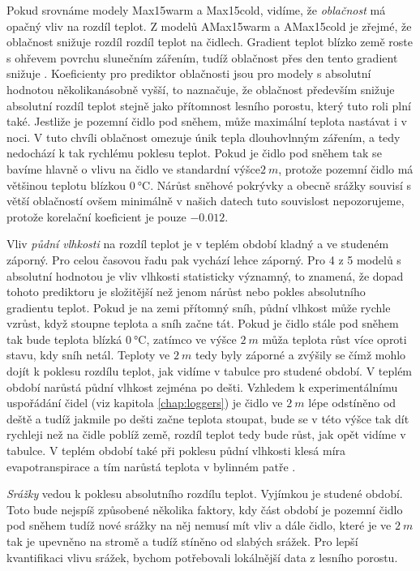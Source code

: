 Pokud srovnáme modely Max15warm a Max15cold, vidíme, že \textit{oblačnost} má opačný vliv na rozdíl teplot. Z modelů AMax15warm a AMax15cold je zřejmé, že oblačnost snižuje rozdíl rozdíl teplot na čidlech. Gradient teplot blízko země roste s ohřevem povrchu slunečním zářením, tudíž oblačnost přes den tento gradient snižuje \parencite{snow_deFrenneForestMicroclimates, cloud_overwinteringclusters}. Koeficienty pro prediktor oblačnosti jsou pro modely s absolutní hodnotou několikanásobně vyšší, to naznačuje, že oblačnost především snižuje absolutní rozdíl teplot stejně jako přítomnost lesního porostu, který tuto roli plní také. Jestliže je pozemní čidlo pod sněhem, může maximální teplota nastávat i v noci. V tuto chvíli oblačnost omezuje únik tepla dlouhovlnným zářením, a tedy nedochází k tak rychlému poklesu teplot. Pokud je čidlo pod sněhem tak se bavíme hlavně o vlivu na čidlo ve standardní výšce$\SI{2}{m}$, protože pozemní čidlo má většinou teplotu blízkou $\SI{0}{\celsius}$. Nárůst sněhové pokrývky a obecně srážky souvisí s větší oblačností ovšem minimálně v našich datech tuto souvislost nepozorujeme, protože korelační koeficient je pouze $-0.012$.

Vliv \textit{půdní vlhkosti} na rozdíl teplot je v teplém období kladný a ve studeném záporný. Pro celou časovou řadu pak vychází lehce záporný. Pro 4 z 5 modelů s absolutní hodnotou je vliv vlhkosti statisticky významný, to znamená, že dopad tohoto prediktoru je složitější než jenom nárůst nebo pokles absolutního gradientu teplot. Pokud je na zemi přítomný sníh, půdní vlhkost může rychle vzrůst, když stoupne teplota a sníh začne tát. Pokud je čidlo stále pod sněhem tak bude teplota blízká $\SI{0}{\celsius}$, zatímco ve výšce $\SI{2}{m}$ můža teplota růst více oproti stavu, kdy sníh netál. Teploty ve $\SI{2}{m}$ tedy byly záporné a zvýšily se čímž mohlo dojít k poklesu rozdílu teplot, jak vidíme v tabulce pro studené období. V teplém období narůstá půdní vlhkost zejména po dešti. Vzhledem k experimentálnímu uspořádání čidel (viz kapitola \ref{chap:loggers}) je čidlo ve $\SI{2}{m}$ lépe odstíněno od deště a tudíž jakmile po dešti začne teplota stoupat, bude se v této výšce tak dít rychleji než na čidle poblíž země, rozdíl teplot tedy bude růst, jak opět vidíme v tabulce. V teplém období také při poklesu půdní vlhkosti klesá míra evapotranspirace a tím narůstá teplota v bylinném patře \parencite{snow_deFrenneForestMicroclimates}.

\textit{Srážky} vedou k poklesu absolutního rozdílu teplot. Vyjímkou je studené období. Toto bude nejspíš způsobené několika faktory, kdy část období je pozemní čidlo pod sněhem tudíž nové srážky na něj nemusí mít vliv a dále čidlo, které je ve $\SI{2}{m}$ tak je upevněno na stromě a tudíž stíněno od slabých srážek. Pro lepší kvantifikaci vlivu srážek, bychom potřebovali lokálnější data z lesního porostu.

